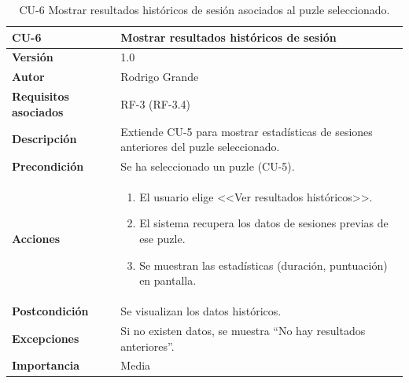 \begin{table}[p]
	\centering
	\begin{tabularx}{\linewidth}{ p{} p{} }
		\toprule
		\textbf{CU-6} & \textbf{Mostrar resultados históricos de sesión}\\
		\toprule
		\textbf{Versión}              & 1.0    \\
		\textbf{Autor}                & Rodrigo Grande \\
		\textbf{Requisitos asociados} & RF-3 (RF-3.4) \\
		\textbf{Descripción}          & Extiende CU-5 para mostrar estadísticas de sesiones anteriores del puzle seleccionado.\\
		\textbf{Precondición}         & Se ha seleccionado un puzle (CU-5). \\
		\textbf{Acciones}             &
		\begin{enumerate}
			\def\labelenumi{\arabic{enumi}.}
			\tightlist
			\item El usuario elige <<Ver resultados históricos>>.
			\item El sistema recupera los datos de sesiones previas de ese puzle.
			\item Se muestran las estadísticas (duración, puntuación) en pantalla.
		\end{enumerate}\\
		\textbf{Postcondición}        & Se visualizan los datos históricos. \\
		\textbf{Excepciones}          & Si no existen datos, se muestra “No hay resultados anteriores”. \\
		\textbf{Importancia}          & Media \\
		\bottomrule
	\end{tabularx}
	\caption{CU-6 Mostrar resultados históricos de sesión asociados al puzle seleccionado.}
	\label{cu:resultados-historicos}
\end{table}

